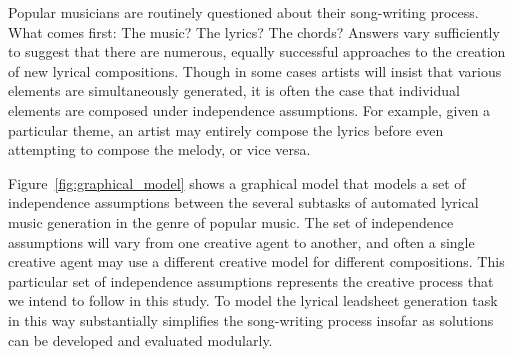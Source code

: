 \documentclass[11pt,phd]{byuprop}
\begin{document}
%
%
%
%
%
%
%
%
%

Popular musicians are routinely questioned about their song-writing process. What comes first: The music? The lyrics? The chords? Answers vary sufficiently to suggest that there are numerous, equally successful approaches to the creation of new lyrical compositions. Though in some cases artists will insist that various elements are simultaneously generated, it is often the case that individual elements are composed under independence assumptions. For example, given a particular theme, an artist may entirely compose the lyrics before even attempting to compose the melody, or vice versa. 

Figure~\ref{fig:graphical_model} shows a graphical model that models a set of independence assumptions between the several subtasks of automated lyrical music generation in the genre of popular music. The set of independence assumptions will vary from one creative agent to another, and often a single creative agent may use a different creative model for different compositions. This particular set of independence assumptions represents the creative process that we intend to follow in this study. To model the lyrical leadsheet generation task in this way substantially simplifies the song-writing process insofar as solutions can be developed and evaluated modularly.
\end{document}
